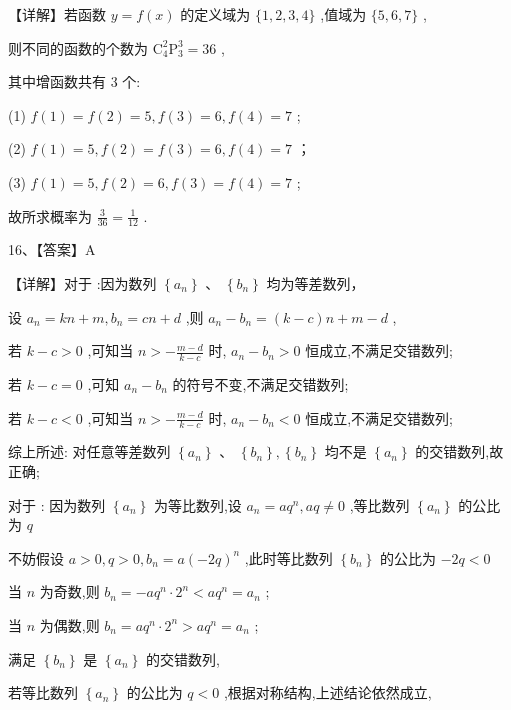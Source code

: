 \documentclass[10pt]{article}
\newcommand*\circled[1]{\tikz[baseline=(char.base)]{\node[shape=circle,draw,inner sep=1.5pt] (char) {\small #1};}}
\begin{document}
【详解】若函数 \(y = f\left( x\right)\) 的定义域为 \(\{ 1,2,3,4\}\) ,值域为 \(\{ 5,6,7\}\) ,

则不同的函数的个数为 \({\mathrm{C}}_{4}^{2}{\mathrm{P}}_{3}^{3} = {36}\) ,

其中增函数共有 3 个:

(1) \(f\left( 1\right)  = f\left( 2\right)  = 5,f\left( 3\right)  = 6,f\left( 4\right)  = 7\) ;

(2) \(f\left( 1\right)  = 5,f\left( 2\right)  = f\left( 3\right)  = 6,f\left( 4\right)  = 7\) ；

(3) \(f\left( 1\right)  = 5,f\left( 2\right)  = 6,f\left( 3\right)  = f\left( 4\right)  = 7\) ;

故所求概率为 \(\frac{3}{36} = \frac{1}{12}\) .

16、【答案】A

【详解】对于 \circled{1} :因为数列 \(\left\{  {a}_{n}\right\}\) 、 \(\left\{  {b}_{n}\right\}\) 均为等差数列，

设 \({a}_{n} = {kn} + m,{b}_{n} = {cn} + d\) ,则 \({a}_{n} - {b}_{n} = \left( {k - c}\right) n + m - d\) ,

若 \(k - c > 0\) ,可知当 \(n >  - \frac{m - d}{k - c}\) 时, \({a}_{n} - {b}_{n} > 0\) 恒成立,不满足交错数列;

若 \(k - c = 0\) ,可知 \({a}_{n} - {b}_{n}\) 的符号不变,不满足交错数列;

若 \(k - c < 0\) ,可知当 \(n >  - \frac{m - d}{k - c}\) 时, \({a}_{n} - {b}_{n} < 0\) 恒成立,不满足交错数列;

综上所述: 对任意等差数列 \(\left\{  {a}_{n}\right\}  \text{ 、 }\left\{  {b}_{n}\right\}  ,\left\{  {b}_{n}\right\}\) 均不是 \(\left\{  {a}_{n}\right\}\) 的交错数列,故 \circled{1} 正确;

对于 \circled{2} : 因为数列 \(\left\{  {a}_{n}\right\}\) 为等比数列,设 \({a}_{n} = a{q}^{n},{aq} \neq  0\) ,等比数列 \(\left\{  {a}_{n}\right\}\) 的公比为 \(q\)

不妨假设 \(a > 0,q > 0,{b}_{n} = a{\left( -2q\right) }^{n}\) ,此时等比数列 \(\left\{  {b}_{n}\right\}\) 的公比为 \(- {2q} < 0\)

当 \(n\) 为奇数,则 \({b}_{n} =  - a{q}^{n} \cdot  {2}^{n} < a{q}^{n} = {a}_{n}\) ;

当 \(n\) 为偶数,则 \({b}_{n} = a{q}^{n} \cdot  {2}^{n} > a{q}^{n} = {a}_{n}\) ;

满足 \(\left\{  {b}_{n}\right\}\) 是 \(\left\{  {a}_{n}\right\}\) 的交错数列,

若等比数列 \(\left\{  {a}_{n}\right\}\) 的公比为 \(q < 0\) ,根据对称结构,上述结论依然成立,
\end{document}
